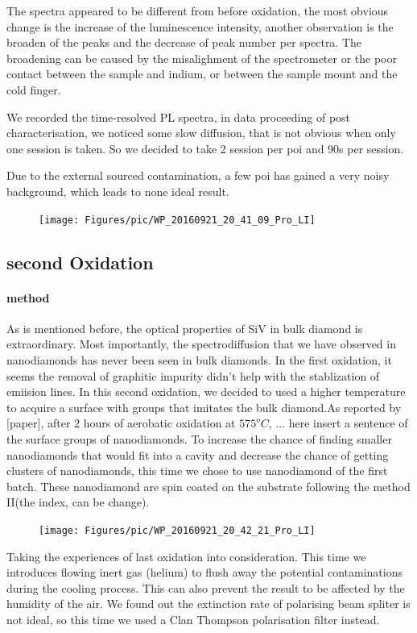 The spectra appeared to be different from before oxidation, the most obvious change is the increase of the luminescence intensity, another observation is the broaden of the peaks and the decrease of peak number per spectra. The broadening can be caused by the misalighment of the spectrometer or the poor contact between the sample and indium, or between the sample mount and the cold finger. 

We recorded the time-resolved PL spectra, in data proceeding of post characterisation, we noticed some slow diffusion, that is not obvious when only one session is taken. So we decided to take 2 session per poi and 90s per session.

Due to the external sourced contamination, a few poi has gained a very noisy background, which leads to none ideal result.






\FloatBarrier
\begin{figure}[h]
\centering
\texttt{[image: Figures/pic/WP\_20160921\_20\_41\_09\_Pro\_LI]}
\caption{}
\label{fig:wp20160921204109proli}
\end{figure}
\FloatBarrier

\subsection[Second Oxidation]{second Oxidation}

\paragraph{method} As is mentioned before, the optical properties of SiV in bulk diamond is extraordinary. Most importantly, the spectrodiffusion that we have observed in nanodiamonds has never been seen in bulk diamonds. In the first oxidation, it seems the removal of graphitic impurity didn't help with the stablization of emiision lines. In this second oxidation, we decided to used a higher temperature to acquire a surface with groups that imitates the bulk diamond.As reported by [paper], after 2 hours of aerobatic oxidation at $575^{o}C$, ... here insert a sentence of the surface groups of nanodiamonds. To increase the chance of finding smaller nanodiamonds that would fit into a cavity and decrease the chance of getting clusters of nanodiamonds, this time we chose to use nanodiamond of the first batch. These nanodiamond are spin coated on the substrate following the method II(the index, can be change).
\FloatBarrier
\begin{figure}[h]
\centering
\texttt{[image: Figures/pic/WP\_20160921\_20\_42\_21\_Pro\_LI]}
\caption{}
\label{fig:wp20160921204221proli}
\end{figure}
\FloatBarrier
Taking the experiences of last oxidation into consideration. This time we introduces flowing inert gas (helium) to flush away the potential contaminations during the cooling process. This can also prevent the result to be affected by the humidity of the air.
We found out the extinction rate of polarising beam spliter is not ideal, so this time we used a Clan Thompson polarisation filter instead.

